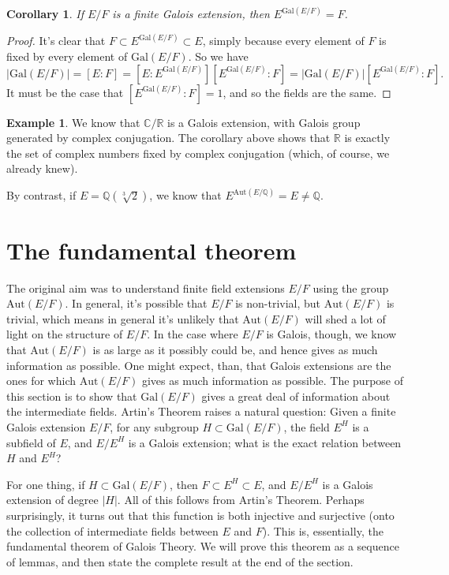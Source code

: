 \documentclass[12pt]{report}
\newtheorem{cor}[thm]{Corollary}
\theoremstyle{definition}
\newtheorem{example}[thm]{Example}
\def\CC{\mathbb{C}}
\def\QQ{\mathbb{Q}}
\def\RR{\mathbb{R}}
\def\Aut{\text{Aut}}
\def\Gal{\text{Gal}}
\begin{document}
\begin{cor}\label{artincor}
    If $E/F$ is a finite Galois extension, then $E^{\Gal(E/F)} = F$.
\end{cor}

\begin{proof}
    It's clear that $F \subset E^{\Gal(E/F)}\subset E$, simply because every element of $F$ is fixed by every element of $\Gal(E/F)$. So we have $$|\Gal(E/F)|=[E : F] = [E : E^{\Gal(E/F)}][E^{\Gal(E/F)} : F] =|\Gal(E/F)|[E^{\Gal(E/F)} : F].$$
    It must be the case that $[E^{\Gal(E/F)} : F] = 1$, and so the fields are the same.
\end{proof}

\begin{example}
    We know that $\CC/\RR$ is a Galois extension, with Galois group generated by complex conjugation. The corollary above shows that $\RR$ is exactly the set of complex numbers fixed by complex conjugation (which, of course, we already knew).

    By contrast, if $E =\QQ(\sqrt[3]{2})$, we know that $E^{\Aut(E/\QQ)} = E \not= \QQ$.
\end{example}

\section{The fundamental theorem}


The original aim was to understand finite field extensions $E/F$ using the group $\Aut(E/F)$. In general, it's possible that $E/F$ is non-trivial, but $\Aut(E/F)$ is trivial, which means in general it's unlikely that $\Aut(E/F)$ will shed a lot of light on the structure of $E/F$. In the case where $E/F$ is Galois, though, we know that $\Aut(E/F)$ is as large as it possibly could be, and hence gives as much information as possible. One might expect, than, that Galois extensions are the ones for which $\Aut(E/F)$ gives as much information as possible. The purpose of this section is to show that $\Gal(E/F)$ gives a great deal of information about the intermediate fields. Artin's Theorem raises a natural question: Given a finite Galois extension $E/F$, for any subgroup $H \subset  \Gal(E/F)$, the field $E^H$ is a subfield of $E$, and $E/E^H$ is a Galois extension; what is the exact relation between $H$ and $E^H$?


For one thing, if $H \subset  \Gal(E/F)$, then $F \subset  E^H \subset  E$, and $E/E^H$ is a Galois extension of degree $|H|$. All of this follows from Artin's Theorem. Perhaps surprisingly, it turns out that this function is both injective and surjective (onto the collection of intermediate fields between $E$ and $F$). This is, essentially, the fundamental theorem of Galois Theory. We will prove this theorem as a sequence of lemmas, and then state the complete result at the end of the section.
\end{document}
